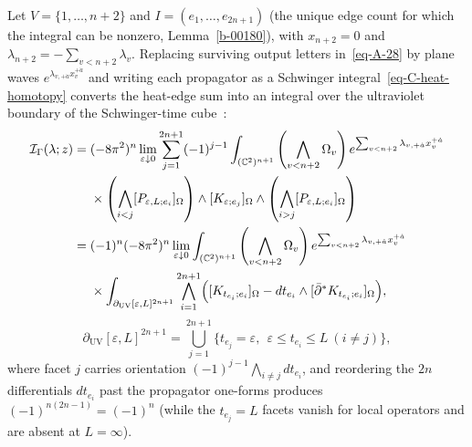 \documentclass[11pt]{article}
\numberwithin{equation}{section}
\numberwithin{figure}{section}
\numberwithin{table}{section}
\begin{document}
Let $V=\{1,\ldots,n+2\}$ and $I=(e_1,\ldots,e_{2n+1})$ (the unique edge count for which the integral can be nonzero, Lemma~\ref{b-00180}), with $x_{n+2}=0$ and $\lambda_{n+2}=-\sum_{v<n+2}\lambda_v$. Replacing surviving output letters in~\eqref{eq-A-28} by plane waves $e^{\lambda_{v,+\dot a}x_v^{+\dot a}}$ and writing each propagator as a Schwinger integral~\eqref{eq-C-heat-homotopy} converts the heat-edge sum into an integral over the ultraviolet boundary of the Schwinger-time cube~\cite{Wang,operatope}:
\begin{equation}\label{eq-1-7}
\begin{aligned}
\mathcal I_\Gamma(\lambda;z)
={}&(-8\pi^2)^n\lim_{\varepsilon\downarrow0}
\sum_{j=1}^{2n+1}(-1)^{j-1}
\int_{(\mathbb C^2)^{n+1}}
\left(\bigwedge_{v<n+2}\Omega_v\right)
e^{\sum_{v<n+2}\lambda_{v,+\dot a}x_v^{+\dot a}}\\
&\times\left(\bigwedge_{i<j}[P_{\varepsilon,L;e_i}]_\Omega\right)
\wedge[K_{\varepsilon;e_j}]_\Omega
\wedge\left(\bigwedge_{i>j}[P_{\varepsilon,L;e_i}]_\Omega\right)\\
={}&(-1)^n(-8\pi^2)^n\lim_{\varepsilon\downarrow0}
\int_{(\mathbb C^2)^{n+1}}
\left(\bigwedge_{v<n+2}\Omega_v\right)
e^{\sum_{v<n+2}\lambda_{v,+\dot a}x_v^{+\dot a}}\\
&\times\int_{\partial_{\mathrm{UV}}[\varepsilon,L]^{2n+1}}
\bigwedge_{i=1}^{2n+1}\Bigl([K_{t_{e_i};e_i}]_\Omega
-dt_{e_i}\wedge[\bar\partial^*K_{t_{e_i};e_i}]_\Omega\Bigr),
\end{aligned}
\end{equation}
\begin{equation}\label{eq-UV-boundary}
\partial_{\mathrm{UV}}[\varepsilon,L]^{2n+1}
=\bigcup_{j=1}^{2n+1}\bigl\{t_{e_j}=\varepsilon,\ \ \varepsilon\le t_{e_i}\le L\ (i\ne j)\bigr\},
\end{equation}
where facet $j$ carries orientation $(-1)^{j-1}\bigwedge_{i\ne j}dt_{e_i}$, and reordering the $2n$ differentials $dt_{e_i}$ past the propagator one-forms produces $(-1)^{n(2n-1)}=(-1)^n$ (while the $t_{e_j}=L$ facets vanish for local operators and are absent at $L=\infty$).
\end{document}
